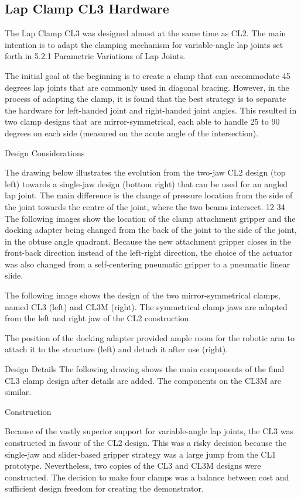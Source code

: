 \begin{itemize}
\subsection{Lap Clamp CL3 Hardware}
The Lap Clamp CL3 was designed almost at the same time as CL2. The main intention is to adapt the clamping mechanism for variable-angle lap joints set forth in 5.2.1 Parametric Variations of Lap Joints. 

The initial goal at the beginning is to create a clamp that can accommodate 45 degrees lap joints that are commonly used in diagonal bracing. However, in the process of adapting the clamp, it is found that the best strategy is to separate the hardware for left-handed joint and right-handed joint angles. This resulted in two clamp designs that are mirror-symmetrical, each able to handle 25 to 90 degrees on each side (measured on the acute angle of the intersection). 

Design Considerations

The drawing below illustrates the evolution from the two-jaw CL2 design (top left) towards a single-jaw design (bottom right) that can be used for an angled lap joint. The main difference is the change of pressure location from the side of the joint towards the centre of the joint, where the two beams intersect.
12
34
The following images show the location of the clamp attachment gripper and the docking adapter being changed from the back of the joint to the side of the joint, in the obtuse angle quadrant. Because the new attachment gripper closes in the front-back direction instead of the left-right direction, the choice of the actuator was also changed from a self-centering pneumatic gripper to a pneumatic linear slide.


The following image shows the design of the two mirror-symmetrical clamps, named CL3 (left) and CL3M (right). The symmetrical clamp jaws are adapted from the left and right jaw of the CL2 construction.

The position of the docking adapter provided ample room for the robotic arm to attach it to the structure (left) and detach it after use (right). 

Design Details
The following drawing shows the main components of the final CL3 clamp design after details are added. The components on the CL3M are similar.


Construction

Because of the vastly superior support for variable-angle lap joints, the CL3 was constructed in favour of the CL2 design. This was a risky decision because the single-jaw and slider-based gripper strategy was a large jump from the CL1 prototype. Nevertheless, two copies of the CL3 and CL3M designs were constructed. The decision to make four clamps was a balance between cost and sufficient design freedom for creating the demonstrator.


\end{itemize}
